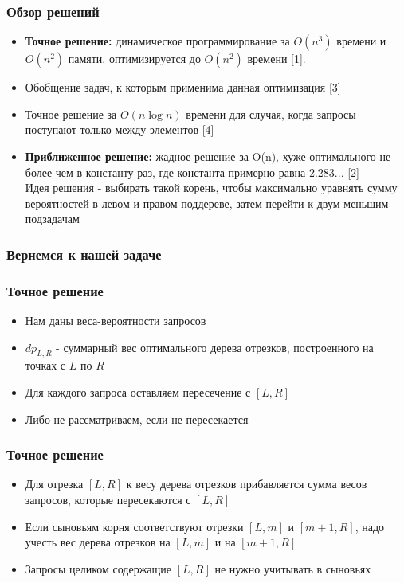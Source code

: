 \documentclass{beamer}
\begin{document}
\begin{frame}
\frametitle{Обзор решений}

\begin{itemize}
\item \textbf{Точное решение:} динамическое программирование за $O(n^3)$ времени и $O(n^2)$ памяти, оптимизируется до $O(n^2)$ времени [1].
\item Обобщение задач, к которым применима данная оптимизация [3]
\item Точное решение за $O(n \log n)$ времени для случая, когда запросы поступают только между элементов [4]
\item \textbf{Приближенное решение:} жадное решение за O(n), хуже оптимального не более чем в константу раз, где константа примерно равна 2.283... [2]  \\ Идея решения - выбирать такой корень, чтобы максимально уравнять сумму вероятностей в левом и правом поддереве, затем перейти к двум меньшим подзадачам

\end{itemize}

\end{frame}

\begin{frame}
\frametitle{Вернемся к нашей задаче}

\end{frame}

\begin{frame}
\frametitle{Точное решение}

\begin{itemize}
\item Нам даны веса-вероятности запросов
\item $dp_{L, R}$ - суммарный вес оптимального дерева отрезков, построенного на точках с $L$ по $R$
\item Для каждого запроса оставляем пересечение с $[L, R]$
\item Либо не рассматриваем, если не пересекается
\end{itemize}

\end{frame}

\begin{frame}
\frametitle{Точное решение}

\begin{itemize}
\item Для отрезка $[L, R]$ к весу дерева отрезков прибавляется сумма весов запросов, которые пересекаются с $[L, R]$
\item Если сыновьям корня соответствуют отрезки $[L, m]$ и $[m + 1, R]$, надо учесть вес дерева отрезков на $[L, m]$ и на $[m + 1, R]$
\item Запросы целиком содержащие $[L, R]$ не нужно учитывать в сыновьях
\end{itemize}


\end{frame}
\end{document}
